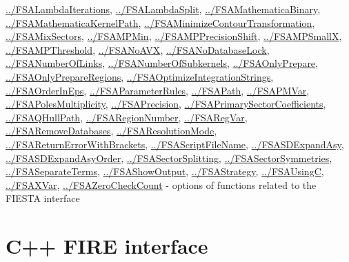 \documentclass[../FeynHelpersManual.tex]{subfiles}
\begin{document}
\begin{itemize}
  \hyperlink{../fsalambdaiterations}{../FSALambdaIterations},
  \hyperlink{../fsalambdasplit}{../FSALambdaSplit},
  \hyperlink{../fsamathematicabinary}{../FSAMathematicaBinary},
  \hyperlink{../fsamathematicakernelpath}{../FSAMathematicaKernelPath},
  \hyperlink{../fsaminimizecontourtransformation}{../FSAMinimizeContourTransformation},
  \hyperlink{../fsamixsectors}{../FSAMixSectors},
  \hyperlink{../fsampmin}{../FSAMPMin},
  \hyperlink{../fsampprecisionshift}{../FSAMPPrecisionShift},
  \hyperlink{../fsampsmallx}{../FSAMPSmallX},
  \hyperlink{../fsampthreshold}{../FSAMPThreshold},
  \hyperlink{../fsanoavx}{../FSANoAVX},
  \hyperlink{../fsanodatabaselock}{../FSANoDatabaseLock},
  \hyperlink{../fsanumberoflinks}{../FSANumberOfLinks},
  \hyperlink{../fsanumberofsubkernels}{../FSANumberOfSubkernels},
  \hyperlink{../fsaonlyprepare}{../FSAOnlyPrepare},
  \hyperlink{../fsaonlyprepareregions}{../FSAOnlyPrepareRegions},
  \hyperlink{../fsaoptimizeintegrationstrings}{../FSAOptimizeIntegrationStrings},
  \hyperlink{../fsaorderineps}{../FSAOrderInEps},
  \hyperlink{../fsaparameterrules}{../FSAParameterRules},
  \hyperlink{../fsapath}{../FSAPath},
  \hyperlink{../fsapmvar}{../FSAPMVar},
  \hyperlink{../fsapolesmultiplicity}{../FSAPolesMultiplicity},
  \hyperlink{../fsaprecision}{../FSAPrecision},
  \hyperlink{../fsaprimarysectorcoefficients}{../FSAPrimarySectorCoefficients},
  \hyperlink{../fsaqhullpath}{../FSAQHullPath},
  \hyperlink{../fsaregionnumber}{../FSARegionNumber},
  \hyperlink{../fsaregvar}{../FSARegVar},
  \hyperlink{../fsaremovedatabases}{../FSARemoveDatabases},
  \hyperlink{../fsaresolutionmode}{../FSAResolutionMode},
  \hyperlink{../fsareturnerrorwithbrackets}{../FSAReturnErrorWithBrackets},
  \hyperlink{../fsascriptfilename}{../FSAScriptFileName},
  \hyperlink{../fsasdexpandasy}{../FSASDExpandAsy},
  \hyperlink{../fsasdexpandasyorder}{../FSASDExpandAsyOrder},
  \hyperlink{../fsasectorsplitting}{../FSASectorSplitting},
  \hyperlink{../fsasectorsymmetries}{../FSASectorSymmetries},
  \hyperlink{../fsaseparateterms}{../FSASeparateTerms},
  \hyperlink{../fsashowoutput}{../FSAShowOutput},
  \hyperlink{../fsastrategy}{../FSAStrategy},
  \hyperlink{../fsausingc}{../FSAUsingC},
  \hyperlink{../fsaxvar}{../FSAXVar},
  \hyperlink{../fsazerocheckcount}{../FSAZeroCheckCount} - options of
  functions related to the FIESTA interface
\end{itemize}

\hypertarget{c++ fire interface}{
\section{C++ FIRE interface}\label{c++ fire interface}}
\end{document}
